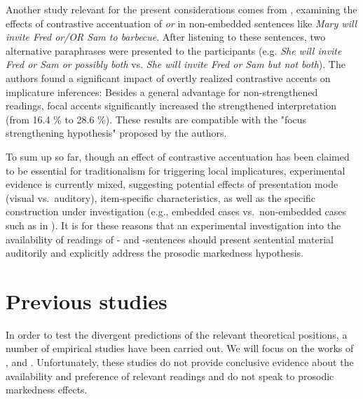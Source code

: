 \documentclass[fleqn,reqno,10pt]{article}
\newcommand{\as}{\acro{as}}
\renewcommand{\es}{\acro{es}}
\begin{document}
Another study relevant for the present considerations comes from
\citet{SchwarzClifton2008:Strengthening-o}, examining the effects of
contrastive accentuation of \emph{or} in non-embedded sentences like
{\it Mary will invite Fred or/OR Sam to barbecue}. After listening to
these sentences, two alternative paraphrases were presented to
the participants (e.g. {\it She will invite Fred or Sam or possibly both} vs. {\it
  She will invite Fred or Sam but not both}).  The authors found a
significant impact of overtly realized contrastive accents on
implicature inferences: Besides a general advantage for
non-strengthened readings, focal accents significantly increased the
strengthened interpretation (from 16.4 \% to 28.6 \%). These results
are compatible with the "focus strengthening hypothesis" proposed by
the authors.

To sum up so far, though an effect of contrastive accentuation has
been claimed to be essential for traditionalism for triggering local
implicatures, experimental evidence is currently mixed, suggesting
potential effects of presentation mode (visual vs.~auditory),
item-specific characteristics, as well as the specific construction
under investigation (e.g., embedded cases vs.~non-embedded cases such
as in \citet{SchwarzClifton2008:Strengthening-o}). It is for these
reasons that an experimental investigation into the availability of
readings of \as- and \es-sentences should present sentential material
auditorily and explicitly address the prosodic markedness hypothesis.

\section{Previous studies}
\label{sec:previous-studies}

In order to test the divergent predictions of the relevant theoretical
positions, a number of empirical studies have been carried out. We
will focus on the works of
\citet{GeurtsPouscoulous2009:Embedded-Implic},
\citet{CliftonDube2010:Embedded-Implic} and
\citet{ChemlaSpector2010:Experimental-Ev} \citep[c.f.][for related
discussion]{BenzGotzner2014:Embedded-implic}. Unfortunately, these
studies do not provide conclusive evidence about the availability and
preference of relevant readings and do not speak to prosodic
markedness effects.

\subsection{\citet{GeurtsPouscoulous2009:Embedded-Implic}}
\label{sec:Geurts-and-Pouscoulous}
\end{document}
